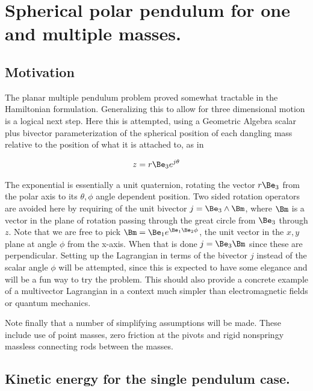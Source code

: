 

\chapter{Spherical polar pendulum for one and multiple masses.}
\label{chap:sPolarMultiPendulum}
{}
\date{Oct 27, 2009}

\beginArtWithToc

\section{Motivation}

The planar multiple pendulum problem proved somewhat tractable in the Hamiltonian formulation.  Generalizing this to allow for three dimensional motion is a logical next step.  Here this is attempted, using a Geometric Algebra scalar plus bivector parameterization of the spherical position of each dangling mass relative to the position of what it is attached to, as in

\begin{align}\label{eqn:sPolarMultiPendulum:zoo1}
z = r \Be_3 e^{j\theta}
\end{align}

The exponential is essentially a unit quaternion, rotating the vector $r \Be_3$ from the polar axis to its $\theta,\phi$ angle dependent position.  Two sided rotation operators are avoided here by requiring of the unit bivector $j = \Be_3 \wedge \Bm$, where $\Bm$ is a vector in the plane of rotation passing through the great circle from $\Be_3$ through $z$.  Note that we are free to pick $\Bm = \Be_1 e^{\Be_1 \Be_2 \phi}$, the unit vector in the $x,y$ plane at angle $\phi$ from the x-axis.  When that is done $j = \Be_3 \Bm$ since these are perpendicular.  Setting up the Lagrangian in terms of the bivector $j$ instead of the scalar angle $\phi$ will be attempted, since this is expected to have some elegance and will be a fun way to try the problem.  This should also provide a concrete example of a multivector Lagrangian in a context much simpler than electromagnetic fields or quantum mechanics.

Note finally that a number of simplifying assumptions will be made.  These include use of point masses, zero friction at the pivots and rigid nonspringy massless connecting rods between the masses.

\section{Kinetic energy for the single pendulum case.}

\EndNoBibArticle
